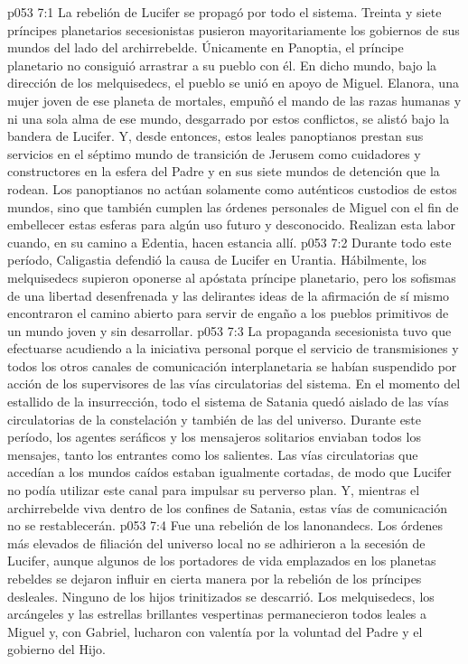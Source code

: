 \vs p053 7:1 La rebelión de Lucifer se propagó por todo el sistema. Treinta y siete príncipes planetarios secesionistas pusieron mayoritariamente los gobiernos de sus mundos del lado del archirrebelde. Únicamente en Panoptia, el príncipe planetario no consiguió arrastrar a su pueblo con él. En dicho mundo, bajo la dirección de los melquisedecs, el pueblo se unió en apoyo de Miguel. Elanora, una mujer joven de ese planeta de mortales, empuñó el mando de las razas humanas y ni una sola alma de ese mundo, desgarrado por estos conflictos, se alistó bajo la bandera de Lucifer. Y, desde entonces, estos leales panoptianos prestan sus servicios en el séptimo mundo de transición de Jerusem como cuidadores y constructores en la esfera del Padre y en sus siete mundos de detención que la rodean. Los panoptianos no actúan solamente como auténticos custodios de estos mundos, sino que también cumplen las órdenes personales de Miguel con el fin de embellecer estas esferas para algún uso futuro y desconocido. Realizan esta labor cuando, en su camino a Edentia, hacen estancia allí.
\vs p053 7:2 Durante todo este período, Caligastia defendió la causa de Lucifer en Urantia. Hábilmente, los melquisedecs supieron oponerse al apóstata príncipe planetario, pero los sofismas de una libertad desenfrenada y las delirantes ideas de la afirmación de sí mismo encontraron el camino abierto para servir de engaño a los pueblos primitivos de un mundo joven y sin desarrollar.
\vs p053 7:3 La propaganda secesionista tuvo que efectuarse acudiendo a la iniciativa personal porque el servicio de transmisiones y todos los otros canales de comunicación interplanetaria se habían suspendido por acción de los supervisores de las vías circulatorias del sistema. En el momento del estallido de la insurrección, todo el sistema de Satania quedó aislado de las vías circulatorias de la constelación y también de las del universo. Durante este período, los agentes seráficos y los mensajeros solitarios enviaban todos los mensajes, tanto los entrantes como los salientes. Las vías circulatorias que accedían a los mundos caídos estaban igualmente cortadas, de modo que Lucifer no podía utilizar este canal para impulsar su perverso plan. Y, mientras el archirrebelde viva dentro de los confines de Satania, estas vías de comunicación no se restablecerán.
\vs p053 7:4 Fue una rebelión de los lanonandecs. Los órdenes más elevados de filiación del universo local no se adhirieron a la secesión de Lucifer, aunque algunos de los portadores de vida emplazados en los planetas rebeldes se dejaron influir en cierta manera por la rebelión de los príncipes desleales. Ninguno de los hijos trinitizados se descarrió. Los melquisedecs, los arcángeles y las estrellas brillantes vespertinas permanecieron todos leales a Miguel y, con Gabriel, lucharon con valentía por la voluntad del Padre y el gobierno del Hijo.
